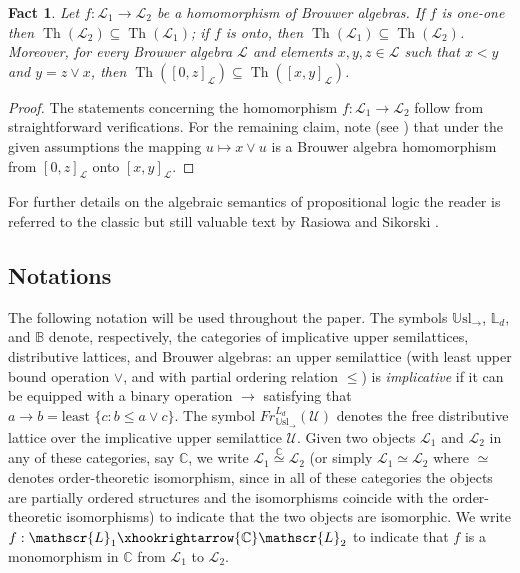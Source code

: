 \documentclass[11pt]{amsart}
\newtheorem{fact}[theorem]{Fact}
\newcommand{\Th}{\operatorname{Th}}
\newcommand{\Usl}{\mathbb{U}\textrm{sl}}
\begin{document}
\begin{fact}\label{fact:1}
Let $f: \mathscr{L}_1 \longrightarrow \mathscr{L}_2$ be a homomorphism of 
Brouwer algebras. If $f$ is one-one then $\Th{(\mathscr{L}_2)}\subseteq 
\Th{(\mathscr{L}_1 )}$;  if $f$ is onto, then  $\Th{(\mathscr{L}_1)}\subseteq 
\Th{(\mathscr{L}_2)}$. Moreover,  for every Brouwer algebra $\mathscr{L}$ and 
elements $x,y, z \in \mathscr{L}$ such that $x<y$ and $y= z \lor x$, then 
$\Th([0,z]_{\mathscr{L}})\subseteq \Th([x,y]_{\mathscr{L}})$. 
\end{fact}

\begin{proof}
The statements concerning the homomorphism $f: \mathscr{L}_1 \longrightarrow 
\mathscr{L}_2$ follow from straightforward verifications. For the remaining 
claim, note (see \cite[Lemma~4]{Skvortsova:intuitionism}) that under the 
given assumptions the mapping $u \mapsto x \lor u$ is a Brouwer algebra 
homomorphism from $[0,z]_{\mathscr{L}}$ onto $[x,y]_{\mathscr{L}}$. 
\end{proof}

For further details on the algebraic semantics of propositional logic the 
reader is referred to the classic but still valuable text by Rasiowa and 
Sikorski \cite{Rasiowa-Sikorski:Book}. 

\subsection{Notations}\label{ssct:notations}

The following notation will be used throughout the paper. The symbols 
$\Usl_{\rightarrow}$, $\mathbb{L}_d$, and $\mathbb{B}$ denote, respectively, 
the categories of implicative upper semilattices, distributive lattices, and 
Brouwer algebras: an upper semilattice (with least upper bound operation 
$\lor$, and with partial ordering relation $\leq$) is \emph{implicative} if 
it can be equipped with a binary operation $\rightarrow$ satisfying that $a 
\rightarrow b=\textrm{least }\{c: b \leq a\lor c\}$. The symbol 
$Fr^{L_d}_{\Usl_{\rightarrow}}(\mathscr{U})$ denotes the free distributive 
lattice over the implicative upper semilattice $\mathscr{U}$. Given two 
objects $\mathscr{L}_1$ and $\mathscr{L}_2$ in any of these categories, say 
$\mathbb{C}$, we write $\mathscr{L}_1 \overset{\mathbb{C}}{\simeq} 
\mathscr{L}_2$ (or simply $\mathscr{L}_1 \simeq \mathscr{L}_2$ where $\simeq$ 
denotes order-theoretic isomorphism, since in all of these categories the 
objects are partially ordered structures and the isomorphisms coincide with 
the order-theoretic isomorphisms) to indicate that the two objects are 
isomorphic. We write $f : \mathscr{L}_1 \xhookrightarrow{\mathbb{C}} 
\mathscr{L}_2$ to indicate that $f$ is a monomorphism in $\mathbb{C}$ from 
$\mathscr{L}_1$ to $\mathscr{L}_2$.   
\end{document}
